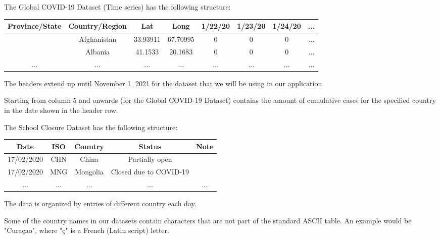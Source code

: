 \documentclass[fontsize=11pt]{article}
\begin{document}
    The Global COVID-19 Dataset (Time series) has the following structure:

    \begin{center}
        \begin{tabular}{ |c|c|c|c|c|c|c|c| }
            \hline
            Province/State & Country/Region & Lat      & Long     & 1/22/20 & 1/23/20 & 1/24/20 & ... \\
            \hline
            & Afghanistan    & 33.93911 & 67.70995 & 0       & 0       & 0       & ... \\
            \hline
            & Albania        & 41.1533  & 20.1683  & 0       & 0       & 0       & ... \\
            \hline
            ...            & ...            & ...      & ...      & ...     & ...     & ...     & ... \\
            \hline
        \end{tabular}
    \end{center}

    The headers extend up until November 1, 2021 for the dataset that we will be using in our application.

    Starting from column 5 and onwards (for the Global COVID-19 Dataset) contains the amount of cumulative cases for the specified country in the date shown in the header row.

    The School Closure Dataset has the following structure:
    \begin{center}
        \begin{tabular}{ |c|c|c|c|c| }
            \hline
            Date       & ISO & Country  & Status                  & Note\\
            \hline
            17/02/2020 & CHN & China    & Partially open          & \\
            \hline
            17/02/2020 & MNG & Mongolia & Closed due to COVID-19  & \\
            \hline
            ...        & ... & ...      & ...                     & ...\\
            \hline
        \end{tabular}
    \end{center}

    The data is organized by entries of different country each day.

    Some of the country names in our datasets contain characters that are not part of the standard ASCII table. An example would be "Cura\c{c}ao", where "\c{c}" is a French (Latin script) letter.
\end{document}
